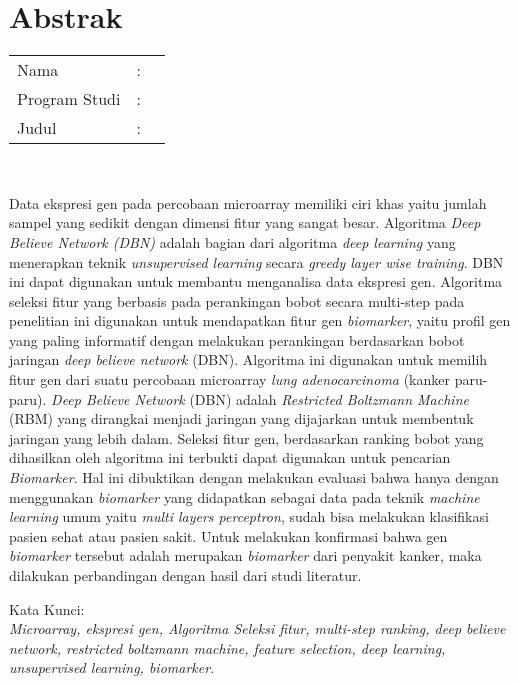 %
%
%

\chapter*{Abstrak}

\vspace*{0.2cm}

\noindent \begin{tabular}{l l p{10cm}}
	Nama&: & \penulis \\
	Program Studi&: & \program \\
	Judul&: & \judul \\
\end{tabular} \\ 

\vspace*{0.5cm}

\noindent 
Data ekspresi gen pada percobaan microarray memiliki ciri khas yaitu jumlah sampel yang sedikit dengan dimensi fitur yang sangat besar. Algoritma \textit{Deep Believe Network (DBN)}  adalah bagian dari algoritma \textit{deep learning} yang menerapkan teknik \textit{unsupervised learning} secara \textit{greedy layer wise training}. DBN ini dapat digunakan untuk membantu menganalisa data ekspresi gen. Algoritma seleksi fitur yang berbasis pada perankingan bobot secara multi-step pada penelitian ini digunakan untuk mendapatkan fitur gen \textit{biomarker}, yaitu profil gen yang paling informatif dengan melakukan perankingan berdasarkan bobot jaringan \textit{deep believe network} (DBN). Algoritma ini digunakan untuk  memilih fitur gen dari suatu percobaan microarray \textit{lung adenocarcinoma} (kanker paru-paru). \textit{Deep Believe Network} (DBN) adalah \textit{Restricted Boltzmann Machine} (RBM) yang dirangkai menjadi jaringan yang  dijajarkan untuk membentuk jaringan yang lebih dalam. Seleksi fitur gen, berdasarkan ranking bobot yang dihasilkan oleh algoritma ini terbukti dapat digunakan untuk pencarian \textit{Biomarker}. Hal ini dibuktikan dengan melakukan evaluasi bahwa hanya dengan menggunakan \textit{biomarker} yang didapatkan sebagai data pada teknik \textit{machine learning} umum yaitu \textit{multi layers perceptron}, sudah bisa melakukan klasifikasi pasien sehat atau pasien sakit. Untuk melakukan konfirmasi bahwa gen \textit{biomarker} tersebut adalah merupakan \textit{biomarker} dari penyakit kanker, maka dilakukan perbandingan dengan hasil dari studi literatur.

\vspace*{0.2cm}

\noindent Kata Kunci: \\ 
\noindent 
\textit{Microarray, ekspresi gen, Algoritma Seleksi fitur, multi-step ranking, deep believe network, restricted boltzmann machine, feature selection, deep learning, unsupervised learning, biomarker.}

\newpage